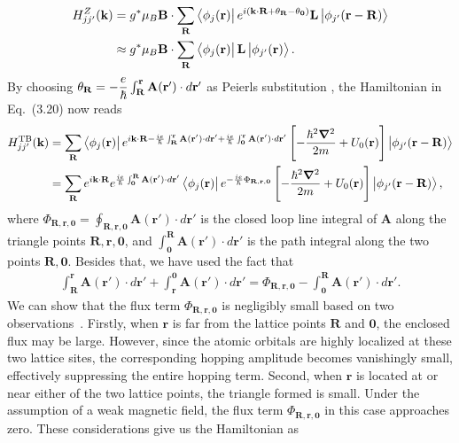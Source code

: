 \begin{equation}
	\begin{aligned}
		H_{jj'}^{Z}(\mathbf{k})
		& = g^{*} \mu_{B} \mathbf{B} \cdot \sum_{\mathbf{R}} \bra{\phi_{j}(\mathbf{r})} e^{i(\mathbf{k \cdot R} + \theta_{\mathbf{R}} - \theta_{\mathbf{0}} )} \mathbf{L} \ket{\phi_{j'}(\mathbf{r - R})} \\
		& \approx g^{*} \mu_{B} \mathbf{B} \cdot \sum_{\mathbf{R}} \bra{\phi_{j}(\mathbf{r})} \mathbf{L} \ket{\phi_{j'}(\mathbf{r})}.
	\end{aligned}
\end{equation}
By choosing $\theta_{\mathbf{R}} = - \dfrac{e}{\hbar} \int_{\mathbf{R}}^{\mathbf{r}} \mathbf{A(\mathbf{r'})} \cdot d\mathbf{r'}$ as Peierls substitution \cite{peierls1933theorie}, the Hamiltonian in Eq.~(3.20) now reads
\begin{equation}
	\begin{aligned}
		H_{jj'}^{\text{TB}}(\mathbf{k})
		& = \sum_{\mathbf{R}} \bra{\phi_{j}(\mathbf{r})} e^{i\mathbf{k \cdot R} - \frac{ie}{\hbar} \int_{\mathbf{R}}^{\mathbf{r}} \mathbf{A}(\mathbf{r'}) \cdot d\mathbf{r'} + \frac{ie}{\hbar}\int_{\mathbf{0}}^{\mathbf{r}}\mathbf{A(\mathbf{r'})}\cdot d\mathbf{r'} } \left[- \dfrac{\hbar^{2} \boldsymbol{\nabla}^{2}}{2m} + U_{0} (\mathbf{r}) \right] \ket{\phi_{j'}(\mathbf{r - R})} \\
		& = \sum_{\mathbf{R}}  e^{i\mathbf{k \cdot R}} e^{\frac{ie}{\hbar} \int_{\mathbf{0}}^{\mathbf{R}} \mathbf{A(\mathbf{r'})} \cdot d \mathbf{r'} } \bra{\phi_{j}(\mathbf{r})} e^{-\frac{ie}{\hbar} \Phi_{\mathbf{R,r,0}}} \left[ -\dfrac{\hbar^{2} \boldsymbol{\nabla}^{2}}{2m} + U_{0} (\mathbf{r}) \right] \ket{\phi_{j'}(\mathbf{r - R})},
	\end{aligned}
\end{equation}
where $\Phi_{\mathbf{R,r,0}} = \oint_{\mathbf{R,r,0}} \mathbf{A(\mathbf{r'})} \cdot d\mathbf{r'} $ is the closed loop line integral of $\mathbf{A}$ along the triangle points $\mathbf{R,r,0}$, and $\int_{\mathbf{0}}^{\mathbf{R}} \mathbf{A(\mathbf{r'})} \cdot d \mathbf{r'}$ is the path integral along the two points $\mathbf{R,0}$. Besides that, we have used the fact that
\begin{align}
	\int_{\mathbf{R}}^{\mathbf{r}} \mathbf{A(\mathbf{r'})} \cdot d\mathbf{r'} + \int_{\mathbf{r}}^{\mathbf{0}} \mathbf{A(r')} \cdot d\mathbf{r'} = \Phi_{\mathbf{R,r,0}} - \int_{\mathbf{0}}^{\mathbf{R}} \mathbf{A(\mathbf{r'})} \cdot d \mathbf{r'}.
\end{align}
We can show that the flux term $\Phi_{\mathbf{R}, \mathbf{r}, \mathbf{0}}$ is negligibly small based on two observations~\cite{yalcin_2019}. Firstly, when $\mathbf{r}$ is far from the lattice points $\mathbf{R}$ and $\mathbf{0}$, the enclosed flux may be large. However, since the atomic orbitals are highly localized at these two lattice sites, the corresponding hopping amplitude becomes vanishingly small, effectively suppressing the entire hopping term. Second, when $\mathbf{r}$ is located at or near either of the two lattice points, the triangle formed is small. Under the assumption of a weak magnetic field, the flux term $\Phi_{\mathbf{R}, \mathbf{r}, \mathbf{0}}$ in this case approaches zero. These considerations give us the Hamiltonian as
